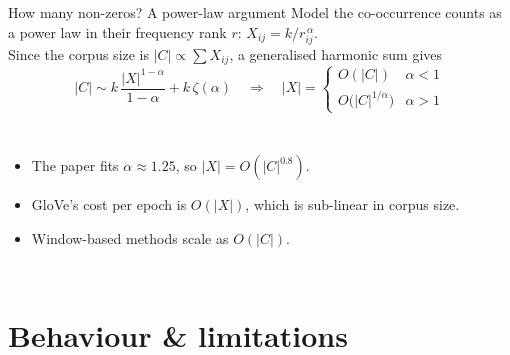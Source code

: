 \documentclass[aspectratio=169,11pt]{beamer}
\begin{document}
\begin{frame}{How many non-zeros? A power-law argument}
\small
Model the co-occurrence counts as a power law in their frequency rank $r$: $X_{ij}=k/r_{ij}^{\,\alpha}$.\\
Since the corpus size is $|C|\propto\sum X_{ij}$, a generalised harmonic sum gives
\[
|C|\sim k\,\frac{|X|^{1-\alpha}}{1-\alpha}+k\,\zeta(\alpha)
\quad\Longrightarrow\quad
|X|=\begin{cases}O(|C|) & \alpha<1\\ O\big(|C|^{1/\alpha}\big) & \alpha>1\end{cases}
\]
\begin{columns}[c]
\begin{itemize}
  \item The paper fits $\alpha\approx1.25$, so $|X|=O(|C|^{0.8})$.
  \item GloVe's cost per epoch is $O(|X|)$, which is \alert{sub-linear in corpus size}.
  \item Window-based methods scale as $O(|C|)$.
\end{itemize}
\end{columns}
\end{frame}

\section{Behaviour \& limitations}
\end{document}
